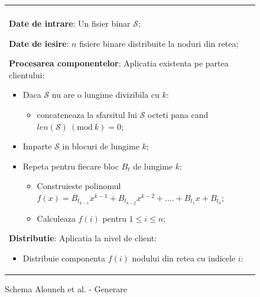 \documentclass{llncs}
\newcommand{\Mod}[1]{\ (\text{mod}\ #1)}
\begin{document}
\begin{figure}[h!]

\begin{tabular}{|p{\textwidth}|}
\hline

\\
\hspace{.1in}
\textbf{Date de intrare}: Un fisier binar $\mathcal{S}$;
\medskip

\hspace{.1in}
\textbf{Date de iesire}: $n$ fisiere binare distribuite la noduri din retea;
\medskip

\hspace{.1in}
\textbf{Procesarea componentelor}: Aplicatia existenta pe partea clientului: 
	\begin{itemize}
		\item Daca $\mathcal{S}$ nu are o lungime divizibila cu $k$:
			\begin{itemize}
			\item concateneaza la sfarsitul lui $\mathcal{S}$ octeti pana cand $len(\mathcal{S}) \Mod k = 0$;
			\end{itemize}
		\item Imparte $\mathcal{S}$ in blocuri de lungime $k$;
		\item Repeta pentru fiecare bloc $B_t$ de lungime $k$:
		\begin{itemize}
			\item Construieste polinomul $f(x) = B_{t_{k - 1}}x ^ {k-1} + B_{t_{k - 2}}x ^ {k - 2} + .... + B_{t_1}x + B_{t_0}$;
			\item Calculeaza $f(i)$ pentru $1 \leq i \leq n$;
		\end{itemize}
	\end{itemize}

\hspace{.1in}
\textbf{Distributie}: Aplicatia la nivel de client:
	\begin{itemize}
		\item Distribuie componenta $f(i)$ nodului din retea cu indicele $i$:
	\end{itemize}

\\
\hline
\end{tabular}
\caption{Schema Alouneh et al. - Generare}
\label{fig:alouneh_distribution}
\end{figure}

\end{document}
